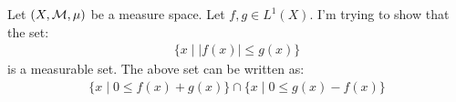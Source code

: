 \documentclass[preview, border=10pt]{standalone}
\begin{document}
Let $(X,\mathcal{M},\mu)$ be a measure space. Let $f,g \in L^1(X)$. I'm trying to show that the set:
    \begin{equation*}
    \begin{split}
        \{x \mid |f(x)| \leq g(x)\}
    \end{split}
    \end{equation*}
is a measurable set. The above set can be written as:
    \begin{equation*}
    \begin{split}
        \{x \mid 0 \leq f(x) + g(x)\} \cap \{x \mid 0 \leq g(x) - f(x)\}
    \end{split}
    \end{equation*}
\end{document}
